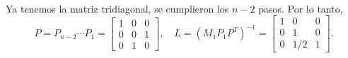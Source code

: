 \begin{frame}
\begin{solution}
\begin{enumerate}[b)]
\begin{align*}
			      \end{align*}
			      Ya tenemos la matriz tridiagonal, se cumplieron los $n-2$ pasos.
			      Por lo tanto,
			      \begin{equation*}
				      P=P_{n-2}\cdots P_{1}=
				      \begin{bmatrix}
					      1 & 0 & 0 \\
					      0 & 0 & 1 \\
					      0 & 1 & 0
				      \end{bmatrix},\quad
				      L=
				      {\left(M_{1}P_{1}P^{T}\right)}^{-1}=
				      \begin{bmatrix}
					      1 & 0   & 0 \\
					      0 & 1   & 0 \\
					      0 & 1/2 & 1
				      \end{bmatrix}.
			      \end{equation*}
		\end{enumerate}
	\end{solution}
\end{frame}

